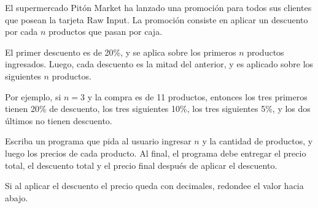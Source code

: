 El supermercado Pitón Market ha lanzado una promoción
para todos sus clientes que posean la tarjeta Raw Input.
La promoción consiste en aplicar un descuento
por cada \(n\) productos que pasan por caja.

\begin{minipage}[t]{.55\textwidth}
  El primer descuento es de 20\%,
  y se aplica sobre los primeros \(n\) productos ingresados.
  Luego,
  cada descuento es la mitad del anterior,
  y es aplicado sobre los siguientes \(n\) productos.
  \vspace{1ex}

  Por ejemplo,
  si \(n = 3\) y la compra es de 11 productos,
  entonces los tres primeros tienen 20\% de descuento,
  los tres siguientes 10\%,
  los tres siguientes 5\%,
  y los dos últimos no tienen descuento.
  \vspace{1ex}

  Escriba un programa que pida al usuario ingresar \(n\)
  y la cantidad de productos,
  y luego los precios de cada producto.
  Al final,
  el programa debe entregar el precio total,
  el descuento total
  y el precio final después de aplicar el descuento.
  \vspace{1ex}

  Si al aplicar el descuento el precio queda con decimales,
  redondee el valor hacia abajo.
\end{minipage}
\hfill
\begin{minipage}[t]{.35\textwidth}
  
\end{minipage}

